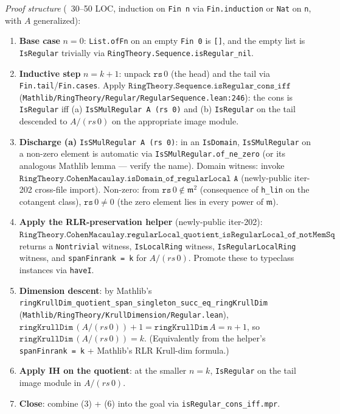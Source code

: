 \begin{itemize}
    \emph{Proof structure} (~30--50 LOC, induction on \texttt{Fin n}
    via \texttt{Fin.induction} or \texttt{Nat} on \texttt{n}, with
    \(A\) generalized):
    \begin{enumerate}
      \item \textbf{Base case} \(n = 0\): \texttt{List.ofFn} on an
        empty \texttt{Fin 0} is \texttt{[]}, and the empty list is
        \texttt{IsRegular} trivially via \texttt{RingTheory.Sequence.isRegular\_nil}.
      \item \textbf{Inductive step} \(n = k+1\): unpack
        \(\texttt{rs}\,0\) (the head) and the tail via
        \texttt{Fin.tail}/\texttt{Fin.cases}. Apply
        \(\texttt{RingTheory.Sequence.isRegular\_cons\_iff}\)
        (\texttt{Mathlib/RingTheory/Regular/RegularSequence.lean:246}):
        the cons is \texttt{IsRegular} iff (a) \texttt{IsSMulRegular
        A (rs 0)} and (b) \texttt{IsRegular} on the tail descended
        to \(A / (rs\,0)\) on the appropriate image module.
      \item \textbf{Discharge (a)} \texttt{IsSMulRegular A (rs 0)}:
        in an \texttt{IsDomain}, \texttt{IsSMulRegular} on a non-zero
        element is automatic via \texttt{IsSMulRegular.of\_ne\_zero}
        (or its analogous Mathlib lemma — verify the name).
        Domain witness: invoke
        \(\texttt{RingTheory.CohenMacaulay.isDomain\_of\_regularLocal A}\)
        (newly-public iter-202 cross-file import). Non-zero: from
        \(\texttt{rs}\,0 \notin \mathfrak m^2\) (consequence of
        \texttt{h\_lin} on the cotangent class), \(\texttt{rs}\,0
        \neq 0\) (the zero element lies in every power of
        \(\mathfrak m\)).
      \item \textbf{Apply the RLR-preservation helper} (newly-public
        iter-202): \(\texttt{RingTheory.CohenMacaulay.regularLocal\_quotient\_isRegularLocal\_of\_notMemSq A hdim (rs 0) hxMem hxNotSq}\)
        returns a \texttt{Nontrivial} witness, \texttt{IsLocalRing}
        witness, \texttt{IsRegularLocalRing} witness, and
        \texttt{spanFinrank = k} for \(A / (rs\,0)\). Promote these
        to typeclass instances via \texttt{haveI}.
      \item \textbf{Dimension descent}: by Mathlib's
        \texttt{ringKrullDim\_quotient\_span\_singleton\_succ\_eq\_ringKrullDim}
        (\texttt{Mathlib/RingTheory/KrullDimension/Regular.lean}),
        \(\texttt{ringKrullDim}\,(A / (rs\,0)) + 1 = \texttt{ringKrullDim}\,A = n + 1\),
        so \(\texttt{ringKrullDim}\,(A / (rs\,0)) = k\).
        (Equivalently from the helper's \texttt{spanFinrank = k} +
        Mathlib's RLR Krull-dim formula.)
      \item \textbf{Apply IH on the quotient}: at the smaller
        \(n = k\), \texttt{IsRegular} on the tail image module in
        \(A / (rs\,0)\).
      \item \textbf{Close}: combine (3) + (6) into the goal via
        \texttt{isRegular\_cons\_iff.mpr}.
    \end{enumerate}


\end{itemize}
